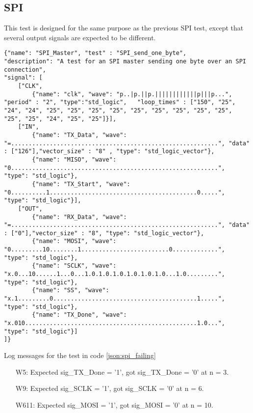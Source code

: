\subsection{SPI}
This test is designed for the same purpose as the previous SPI test, except that several output signals are expected to be different.
\begin{lstlisting}[style=json, caption={Failing functionality test for the SPI design in appendix \ref{appendix:spi}}, label={json:spi_failing}]
{"name": "SPI_Master", "test" : "SPI_send_one_byte",
"description": "A test for an SPI master sending one byte over an SPI connection",
"signal": [
	["CLK",
		{"name": "clk", "wave": "p..|p.||p.||||||||||||p|||p...", "period" : "2", "type":"std_logic",	"loop_times" : ["150", "25", "24", "24", "25", "25", "25", "25", "25", "25", "25", "25", "25", "25", "25", "24", "25", "25"]}],
	["IN",
		{"name": "TX_Data", "wave": "=...........................................................", "data" : ["126"],"vector_size" : "8" , "type": "std_logic_vector"},
		{"name": "MISO", "wave": "0...........................................................", "type": "std_logic"},
		{"name": "TX_Start", "wave": "0..........1..........................................0.....", "type": "std_logic"}],
	["OUT",
		{"name": "RX_Data", "wave": "=...........................................................", "data" : ["0"],"vector_size" : "8", "type": "std_logic_vector"},
		{"name": "MOSI", "wave": "0.........10........1.........................0.............", "type": "std_logic"},
		{"name": "SCLK", "wave": "x.0...10......1...0...1.0.1.0.1.0.1.0.1.0.1.0...1.0.........", "type": "std_logic"},
		{"name": "SS", "wave": "x.1.........0.........................................1.....", "type": "std_logic"},
		{"name": "TX_Done", "wave": "x.010.................................................1.0...", "type": "std_logic"}]
]}
\end{lstlisting}
\begin{customenv}
	\caption{Log messages for the test in code \ref{json:spi_failing}}
	\begin{itemize}
		\centering
		\item [W5:] Expected sig\_TX\_Done =  '1',  got sig\_TX\_Done =  '0' at n = 3.
		\item [W9:] Expected sig\_SCLK =  '1',  got sig\_SCLK =  '0' at n = 6.
		\item [W611:] Expected sig\_MOSI =  '1',  got sig\_MOSI =  '0' at n = 10.
	\end{itemize}
\end{customenv}\clearpage